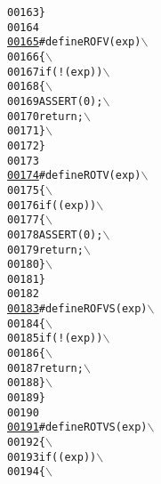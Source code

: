 \begin{footnotesize}
\begin{alltt}
00163 \textcolor{preprocessor}{        \}}
00164 \textcolor{preprocessor}{}
\hypertarget{_macros_8h_source_l00165}{}\hyperlink{_macros_8h_a9e79498009a8cff2281b245448227a19}{00165} \textcolor{preprocessor}{#define ROFV( exp )           \(\backslash\)}
00166 \textcolor{preprocessor}{\{                             \(\backslash\)}
00167 \textcolor{preprocessor}{        if( !( exp ) )              \(\backslash\)}
00168 \textcolor{preprocessor}{\{                           \(\backslash\)}
00169 \textcolor{preprocessor}{        ASSERT( 0 );              \(\backslash\)}
00170 \textcolor{preprocessor}{        return;                   \(\backslash\)}
00171 \textcolor{preprocessor}{        \}                           \(\backslash\)}
00172 \textcolor{preprocessor}{        \}}
00173 \textcolor{preprocessor}{}
\hypertarget{_macros_8h_source_l00174}{}\hyperlink{_macros_8h_afd8d50890b9d9211f62611051a3a24e7}{00174} \textcolor{preprocessor}{#define ROTV( exp )           \(\backslash\)}
00175 \textcolor{preprocessor}{\{                             \(\backslash\)}
00176 \textcolor{preprocessor}{        if( ( exp ) )               \(\backslash\)}
00177 \textcolor{preprocessor}{\{                           \(\backslash\)}
00178 \textcolor{preprocessor}{        ASSERT( 0 );              \(\backslash\)}
00179 \textcolor{preprocessor}{        return;                   \(\backslash\)}
00180 \textcolor{preprocessor}{        \}                           \(\backslash\)}
00181 \textcolor{preprocessor}{        \}}
00182 \textcolor{preprocessor}{}
\hypertarget{_macros_8h_source_l00183}{}\hyperlink{_macros_8h_a1a23e8f661d6c7545b99d65478a38728}{00183} \textcolor{preprocessor}{#define ROFVS( exp )          \(\backslash\)}
00184 \textcolor{preprocessor}{\{                             \(\backslash\)}
00185 \textcolor{preprocessor}{        if( !( exp ) )              \(\backslash\)}
00186 \textcolor{preprocessor}{\{                           \(\backslash\)}
00187 \textcolor{preprocessor}{        return;                   \(\backslash\)}
00188 \textcolor{preprocessor}{        \}                           \(\backslash\)}
00189 \textcolor{preprocessor}{        \}}
00190 \textcolor{preprocessor}{}
\hypertarget{_macros_8h_source_l00191}{}\hyperlink{_macros_8h_a99d064b13ad2f6d2879972138731122a}{00191} \textcolor{preprocessor}{#define ROTVS( exp )          \(\backslash\)}
00192 \textcolor{preprocessor}{\{                             \(\backslash\)}
00193 \textcolor{preprocessor}{        if( ( exp ) )               \(\backslash\)}
00194 \textcolor{preprocessor}{\{                           \(\backslash\)}

\end{alltt}
\end{footnotesize}
